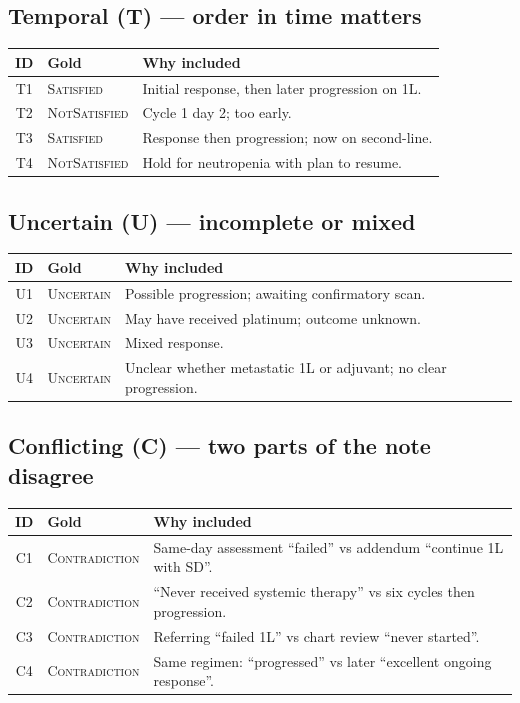 \documentclass[11pt,a4paper]{article}
\newcommand{\sat}{\textsc{Satisfied}}
\newcommand{\nsat}{\textsc{NotSatisfied}}
\newcommand{\unc}{\textsc{Uncertain}}
\newcommand{\con}{\textsc{Contradiction}}
\begin{document}
\subsection{Temporal (T) --- order in time matters}

\begin{tabularx}{\textwidth}{@{}c l Y@{}}
\toprule
ID & Gold & Why included \\
\midrule
T1 & \sat & Initial response, then later progression on 1L. \\
T2 & \nsat & Cycle 1 day 2; too early. \\
T3 & \sat & Response then progression; now on second-line. \\
T4 & \nsat & Hold for neutropenia with plan to resume. \\
\bottomrule
\end{tabularx}

\subsection{Uncertain (U) --- incomplete or mixed}

\begin{tabularx}{\textwidth}{@{}c l Y@{}}
\toprule
ID & Gold & Why included \\
\midrule
U1 & \unc & Possible progression; awaiting confirmatory scan. \\
U2 & \unc & May have received platinum; outcome unknown. \\
U3 & \unc & Mixed response. \\
U4 & \unc & Unclear whether metastatic 1L or adjuvant; no clear progression. \\
\bottomrule
\end{tabularx}

\subsection{Conflicting (C) --- two parts of the note disagree}

\begin{tabularx}{\textwidth}{@{}c l Y@{}}
\toprule
ID & Gold & Why included \\
\midrule
C1 & \con & Same-day assessment ``failed'' vs addendum ``continue 1L with SD''. \\
C2 & \con & ``Never received systemic therapy'' vs six cycles then progression. \\
C3 & \con & Referring ``failed 1L'' vs chart review ``never started''. \\
C4 & \con & Same regimen: ``progressed'' vs later ``excellent ongoing response''. \\
\bottomrule
\end{tabularx}
\end{document}
